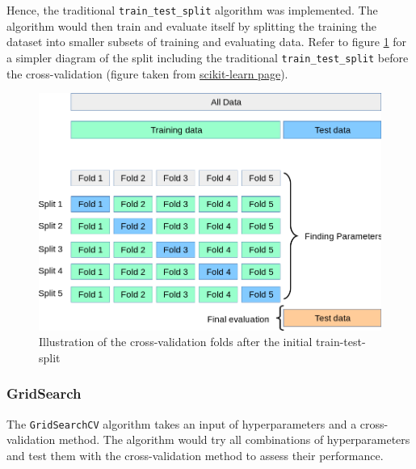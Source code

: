 Hence, the traditional \texttt{train\_test\_split} algorithm was implemented. The algorithm would then train and evaluate itself by splitting the training the dataset into smaller subsets of training and evaluating data. Refer to figure \ref{fig:tts cv} for a simpler diagram of the split including the traditional \texttt{train\_test\_split} before the cross-validation (figure taken from \href{https://scikit-learn.org/stable/modules/cross_validation.html#cross-validation}{{\color{blue} scikit-learn page}}).

\begin{figure}[H]
    \centering
    \includegraphics[width=\linewidth]{figures/grid_search_cross_validation.png}
    \caption{Illustration of the cross-validation folds after the initial train-test-split}
    \label{fig:tts cv}
\end{figure}

\subsubsection{GridSearch}

The \texttt{GridSearchCV} algorithm takes an input of hyperparameters and a cross-validation method. The algorithm would try all combinations of hyperparameters and test them with the cross-validation method to assess their performance. 
